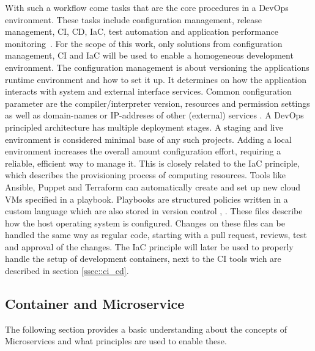 \documentclass[12pt, a4paper]{article}
\begin{document}
        \noindent With such a workflow come tasks that are the core procedures in a DevOps environment. These tasks include configuration management, release management, \ac{CI}, \ac{CD}, \ac{IaC}, test automation and application performance monitoring~\cite{azuredevops}.\newline
        For the scope of this work, only solutions from configuration management, \ac{CI} and \ac{IaC} will be used to enable a homogeneous development environment. The configuration management is about versioning the applications runtime environment and how to set it up. It determines on how the application interacts with system and external interface services. Common configuration parameter are the compiler/interpreter version, resources and permission settings as well as domain-names or \acs{IP}-addreses of other (external) services \cite{base_devops}. A DevOps principled architecture has multiple deployment stages. A staging and live environment is considered minimal base of any such projects. Adding a local environment increases the overall amount configuration effort, requiring a reliable, efficient way to manage it. This is closely related to the \ac{IaC} principle, which describes the provisioning process of computing resources. Tools like Ansible, Puppet and Terraform can automatically create and set up new cloud \ac{VM}s specified in a playbook. Playbooks are structured policies written in a custom language which are also stored in version control \cite{ansible2020}, \cite{azuredevops}.\newline
        These files describe how the host operating system is configured. Changes on these files can be handled the same way as regular code, starting with a pull request, reviews, test and approval of the changes. The \acl{IaC} principle will later be used to properly handle the setup of development containers, next to the \acs{CI} tools wich are described in section \ref{ssec::ci_cd}.

    \subsection{Container and Microservice}\label{ssec::microservices}
    The following section provides a basic understanding about the concepts of Microservices and what principles are used to enable these.
\end{document}
